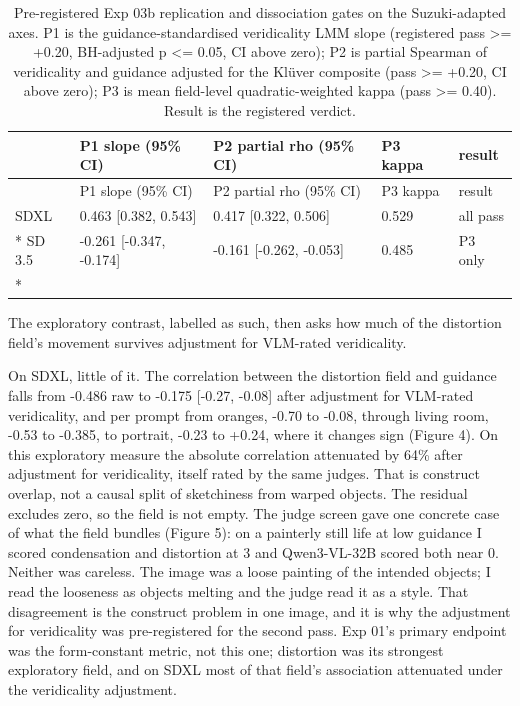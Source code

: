 \documentclass[11pt]{article}
\begin{document}
\begin{longtable}[]{@{}lllll@{}}
\caption{Pre-registered Exp 03b replication and dissociation gates on the
Suzuki-adapted axes. P1 is the guidance-standardised veridicality LMM slope
(registered pass \textgreater= +0.20, BH-adjusted p \textless= 0.05, CI above
zero); P2 is partial Spearman of veridicality and guidance adjusted for the
Klüver composite (pass \textgreater= +0.20, CI above zero); P3 is mean
field-level quadratic-weighted kappa (pass \textgreater= 0.40). Result is the
registered verdict.}\tabularnewline
\toprule\noalign{}
& P1 slope (95\% CI) & P2 partial rho (95\% CI) & P3 kappa & result \\
\midrule\noalign{}
\endfirsthead
\toprule\noalign{}
& P1 slope (95\% CI) & P2 partial rho (95\% CI) & P3 kappa & result \\
\midrule\noalign{}
\endhead
\bottomrule\noalign{}
\endlastfoot
SDXL & 0.463 {[}0.382, 0.543{]} & 0.417 {[}0.322, 0.506{]} & 0.529 & all pass \\*
SD 3.5 & -0.261 {[}-0.347, -0.174{]} & -0.161 {[}-0.262, -0.053{]} & 0.485 & P3
only \\*
\end{longtable}

The exploratory contrast, labelled as such, then asks how much of the distortion
field's movement survives adjustment for VLM-rated veridicality.

On SDXL, little of it. The correlation between the distortion field and guidance
falls from -0.486 raw to -0.175 {[}-0.27, -0.08{]} after adjustment for
VLM-rated veridicality, and per prompt from oranges, -0.70 to -0.08, through
living room, -0.53 to -0.385, to portrait, -0.23 to +0.24, where it changes sign
(Figure 4). On this exploratory measure the absolute correlation attenuated by
64\% after adjustment for veridicality, itself rated by the same judges. That is
construct overlap, not a causal split of sketchiness from warped objects. The
residual excludes zero, so the field is not empty. The judge screen gave one
concrete case of what the field bundles (Figure 5): on a painterly still life at
low guidance I scored condensation and distortion at 3 and Qwen3-VL-32B scored
both near 0. Neither was careless. The image was a loose painting of the
intended objects; I read the looseness as objects melting and the judge read it
as a style. That disagreement is the construct problem in one image, and it is
why the adjustment for veridicality was pre-registered for the second pass. Exp
01's primary endpoint was the form-constant metric, not this one; distortion was
its strongest exploratory field, and on SDXL most of that field's association
attenuated under the veridicality adjustment.
\end{document}
